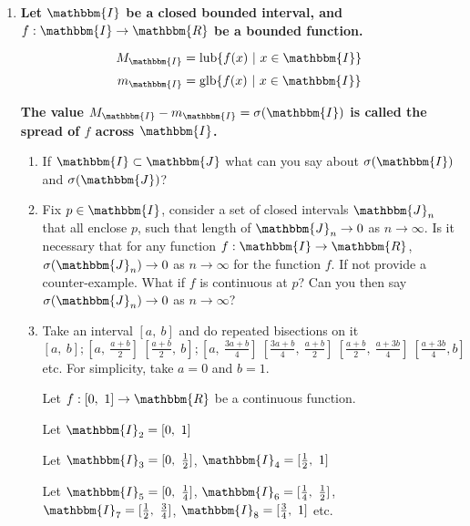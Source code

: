 \documentclass[14pt]{extarticle}
\begin{document}
\begin{enumerate}
\begin{center}
\end{center}


\newpage
\item \textbf{Let $\mathbbm{I}$ be a closed bounded interval, and $f:\mathbbm{I} \to \mathbbm{R}$ be a bounded function.}

\[
M_{\mathbbm{I}} = \text{lub} \{f(x) \ | \ x \in \mathbbm{I} \}
\]
\[
m_{\mathbbm{I}} = \text{glb} \{f(x) \ | \ x \in \mathbbm{I} \}
\]

\textbf{The value $M_{\mathbbm{I}} - m_{\mathbbm{I}} = \sigma(\mathbbm{I})$ is called the spread of $f$ across $\mathbbm{I}$.}

\begin{enumerate}
\item If $\mathbbm{I} \subset \mathbbm{J}$ what can you say about $\sigma(\mathbbm{I})$ and $\sigma(\mathbbm{J})$?
\item Fix $p \in \mathbbm{I}$, consider a set of closed intervals $\mathbbm{J}_n$ that all enclose $p$, such that length of $\mathbbm{J}_n \to 0$ as $n \to \infty$. Is it necessary that for any function $f:\mathbbm{I}\to\mathbbm{R}$, $\sigma(\mathbbm{J}_n) \to 0$ as $n \to \infty$ for the function $f$. If not provide a counter-example. What if $f$ is continuous at $p$? Can you then say $\sigma(\mathbbm{J}_n) \to 0$ as $n \to \infty$?
\item Take an interval $[a, \ b]$ and do repeated bisections on it $[a, \ b]; [a, \ \frac{a+b}{2}] \ [\frac{a+b}{2}, \ b]; [a, \ \frac{3a+b}{4}] \ [\frac{3a+b}{4}, \ \frac{a+b}{2}] \ [\frac{a+b}{2}, \ \frac{a+3b}{4}] \ [\frac{a+3b}{4}, b]$ etc. For simplicity, take $a = 0$ and $b=1$.


Let $f:[0, \ 1] \to \mathbbm{R}$ be a continuous function.

Let $\mathbbm{I}_2 = [0, \ 1]$

Let $\mathbbm{I}_3 = [0, \ \frac{1}{2}]$, $\mathbbm{I}_4 = [\frac{1}{2}, \ 1]$

Let $\mathbbm{I}_5 = [0, \ \frac{1}{4}]$, $\mathbbm{I}_6 = [\frac{1}{4}, \ \frac{1}{2}]$, $\mathbbm{I}_7 = [\frac{1}{2}, \ \frac{3}{4}]$, $\mathbbm{I}_8 = [\frac{3}{4}, \ 1]$ etc.


\end{enumerate}
\end{enumerate}
\end{document}
